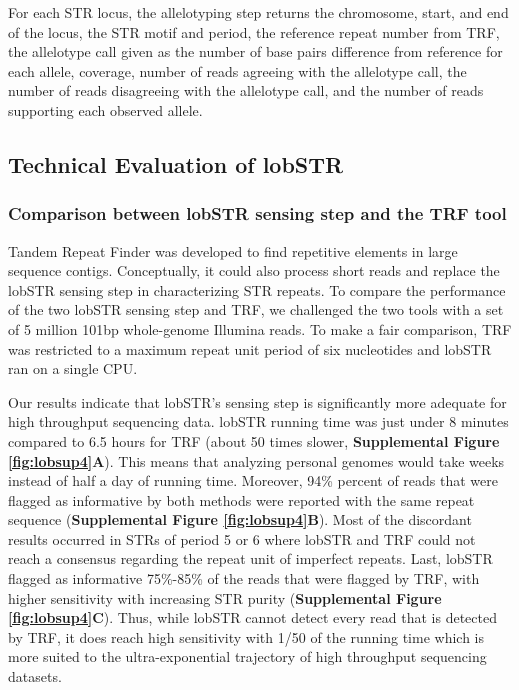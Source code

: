 {For each STR locus, the allelotyping step returns the chromosome, start, and end of the locus, the STR motif and period, the reference repeat number from TRF, the allelotype call given as the number of base pairs difference from reference for each allele, coverage, number of reads agreeing with the allelotype call, the number of reads disagreeing with the allelotype call, and the number of reads supporting each observed allele.

\subsection{Technical Evaluation of lobSTR}
\subsubsection{Comparison between lobSTR sensing step and the TRF tool}
Tandem Repeat Finder was developed to find repetitive elements in large sequence contigs. Conceptually, it could also process short reads and replace the lobSTR sensing step in characterizing STR repeats. To compare the performance of the two lobSTR sensing step and TRF, we challenged the two tools with a set of 5 million 101bp whole-genome Illumina reads. To make a fair comparison, TRF was restricted to a maximum repeat unit period of six nucleotides and lobSTR ran on a single CPU. 

Our results indicate that lobSTR's sensing step is significantly more adequate for high throughput sequencing data. lobSTR running time was just under 8 minutes compared to 6.5 hours for TRF (about 50 times slower, \textbf{Supplemental Figure \ref{fig:lobsup4}A}). This means that analyzing personal genomes would take weeks instead of half a day of running time. Moreover, 94\% percent of reads that were flagged as informative by both methods were reported with the same repeat sequence (\textbf{Supplemental Figure \ref{fig:lobsup4}B}). Most of the discordant results occurred in STRs of period 5 or 6 where lobSTR and TRF could not reach a consensus regarding the repeat unit of imperfect repeats. Last, lobSTR flagged as informative 75\%-85\% of the reads that were flagged by TRF, with higher sensitivity with increasing STR purity (\textbf{Supplemental Figure \ref{fig:lobsup4}C}). Thus, while lobSTR cannot detect every read that is detected by TRF, it does reach high sensitivity with 1/50 of the running time which is more suited to the ultra-exponential trajectory of high throughput sequencing datasets. 

}
